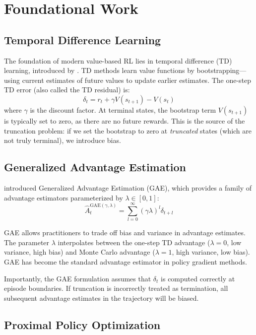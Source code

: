 \documentclass[11pt,a4paper]{article}
\begin{document}
\section{Foundational Work}

\subsection{Temporal Difference Learning}

The foundation of modern value-based RL lies in temporal difference (TD) learning, introduced by \citet{sutton1988learning}. TD methods learn value functions by bootstrapping---using current estimates of future values to update earlier estimates. The one-step TD error (also called the TD residual) is:
\begin{equation}
    \delta_t = r_t + \gamma V(s_{t+1}) - V(s_t)
\end{equation}
where $\gamma$ is the discount factor. At terminal states, the bootstrap term $V(s_{t+1})$ is typically set to zero, as there are no future rewards. This is the source of the truncation problem: if we set the bootstrap to zero at \emph{truncated} states (which are not truly terminal), we introduce bias.

\subsection{Generalized Advantage Estimation}

\citet{schulman2015high} introduced Generalized Advantage Estimation (GAE), which provides a family of advantage estimators parameterized by $\lambda \in [0,1]$:
\begin{equation}
    \hat{A}_t^{\text{GAE}(\gamma, \lambda)} = \sum_{l=0}^{\infty} (\gamma\lambda)^l \delta_{t+l}
\end{equation}

GAE allows practitioners to trade off bias and variance in advantage estimates. The parameter $\lambda$ interpolates between the one-step TD advantage ($\lambda = 0$, low variance, high bias) and Monte Carlo advantage ($\lambda = 1$, high variance, low bias). GAE has become the standard advantage estimator in policy gradient methods.

Importantly, the GAE formulation assumes that $\delta_t$ is computed correctly at episode boundaries. If truncation is incorrectly treated as termination, all subsequent advantage estimates in the trajectory will be biased.

\subsection{Proximal Policy Optimization}
\end{document}
